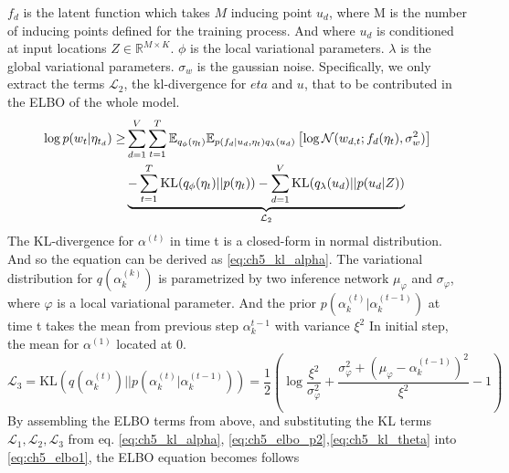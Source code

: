 $ f_d $ is the latent function which takes $ M $ inducing point $ u_d $, where M is the number of inducing points defined for the training process. And where $ u_d $ is conditioned at input locations $ Z\in\mathbb{R}^{M\times K} $. 
$ \phi $ is the local variational parameters. $ \lambda $ is the global variational parameters. $ \sigma_{w} $ is the gaussian noise.
Specifically, we only extract the terms $ \mathcal{L}_{2} $, the kl-divergence for $ eta $ and $ u $, that to be contributed in the ELBO of the whole model.
\begin{align}\label{eq:ch5_elbo_p2}
\log p(w_t|\eta_{t_d})\geq&\sum_{d=1}^{V}\sum_{t=1}^{T}\mathbb{E}_{q_\phi(\eta_t)}\mathbb{E}_{p(f_d|u_d,\eta_t)q_{\lambda}(u_d)}\left[\log\mathcal{N}(w_{d,t};f_d(\eta_t),\sigma_w^2)\right]\notag\\
&\underbrace{-\sum_{t=1}^{T}\text{KL}(q_{\phi}(\eta_t)||p(\eta_t))-\sum_{d=1}^{V}\text{KL}(q_\lambda(u_d)||p(u_d|Z))}_{\mathcal{L}_2}
\end{align}
The KL-divergence for $ \alpha^{(t)} $ in time t is a closed-form in normal distribution. And so the equation can be derived as \ref{eq:ch5_kl_alpha}. The variational distribution for $ q(\alpha_k^{(k)}) $ is parametrized by two inference network $ \mu_{\varphi} $ and $ \sigma_{\varphi} $, where $ \varphi $ is a local variational parameter. And the prior $ p(\alpha_k^{(t)}|\alpha^{(t-1)}_k) $ at time t takes the mean from previous step $ \alpha^{t-1}_{k} $ with variance $ \xi^2 $
In initial step, the mean for $ \alpha^{(1)} $ located at 0.
\begin{equation}\label{eq:ch5_kl_alpha}
\mathcal{L}_{3}=\text{KL}(q(\alpha_k^{(t)})||p(\alpha_k^{(t)}|\alpha^{(t-1)}_k))=\frac{1}{2}\left(\log\frac{\xi^2}{\sigma_\varphi^2}+\frac{\sigma_\varphi^2+(\mu_\varphi-\alpha_k^{(t-1)})^2}{\xi^2}-1\right)
\end{equation}
By assembling the ELBO terms from above, and substituting the KL terms $ \mathcal{L}_{1},\mathcal{L}_{2},\mathcal{L}_{3} $ from eq. \ref{eq:ch5_kl_alpha}, \ref{eq:ch5_elbo_p2},\ref{eq:ch5_kl_theta} into \ref{eq:ch5_elbo1}, the ELBO equation becomes follows
